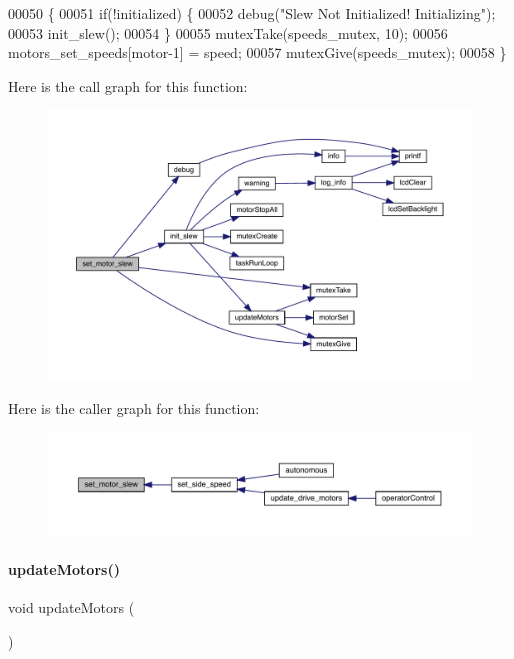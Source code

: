 \begin{DoxyCode}
00050                                          \{
00051   \textcolor{keywordflow}{if}(!initialized) \{
00052     debug(\textcolor{stringliteral}{"Slew Not Initialized! Initializing"});
00053     init_slew();
00054   \}
00055   mutexTake(speeds_mutex, 10);
00056   motors_set_speeds[motor-1] = speed;
00057   mutexGive(speeds_mutex);
00058 \}
\end{DoxyCode}
Here is the call graph for this function\+:\nopagebreak
\begin{figure}[H]
\begin{center}
\leavevmode
\includegraphics[width=350pt]{slew_8c_a7dff2b79dffe55fb936d977594d7c01d_cgraph}
\end{center}
\end{figure}
Here is the caller graph for this function\+:\nopagebreak
\begin{figure}[H]
\begin{center}
\leavevmode
\includegraphics[width=350pt]{slew_8c_a7dff2b79dffe55fb936d977594d7c01d_icgraph}
\end{center}
\end{figure}
\mbox{\label{slew_8c_a807a87c5df438fde21c1e8213906695b}} 
\paragraph{update\+Motors()}
{\footnotesize\ttfamily void update\+Motors (\begin{DoxyParamCaption}{ }\end{DoxyParamCaption})}



